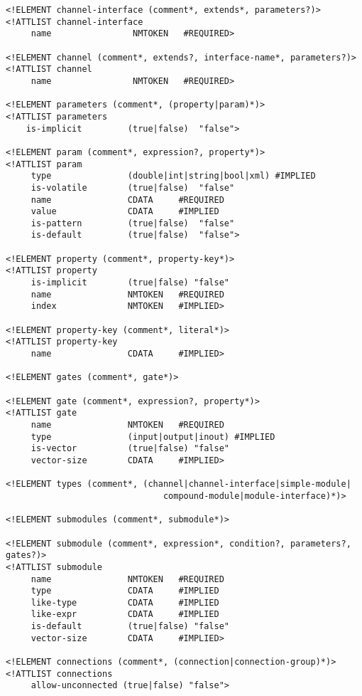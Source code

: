 \begin{verbatim}
<!ELEMENT channel-interface (comment*, extends*, parameters?)>
<!ATTLIST channel-interface
     name                NMTOKEN   #REQUIRED>

<!ELEMENT channel (comment*, extends?, interface-name*, parameters?)>
<!ATTLIST channel
     name                NMTOKEN   #REQUIRED>

<!ELEMENT parameters (comment*, (property|param)*)>
<!ATTLIST parameters
    is-implicit         (true|false)  "false">

<!ELEMENT param (comment*, expression?, property*)>
<!ATTLIST param
     type               (double|int|string|bool|xml) #IMPLIED
     is-volatile        (true|false)  "false"
     name               CDATA     #REQUIRED
     value              CDATA     #IMPLIED
     is-pattern         (true|false)  "false"
     is-default         (true|false)  "false">

<!ELEMENT property (comment*, property-key*)>
<!ATTLIST property
     is-implicit        (true|false) "false"
     name               NMTOKEN   #REQUIRED
     index              NMTOKEN   #IMPLIED>

<!ELEMENT property-key (comment*, literal*)>
<!ATTLIST property-key
     name               CDATA     #IMPLIED>

<!ELEMENT gates (comment*, gate*)>

<!ELEMENT gate (comment*, expression?, property*)>
<!ATTLIST gate
     name               NMTOKEN   #REQUIRED
     type               (input|output|inout) #IMPLIED
     is-vector          (true|false) "false"
     vector-size        CDATA     #IMPLIED>

<!ELEMENT types (comment*, (channel|channel-interface|simple-module|
                               compound-module|module-interface)*)>

<!ELEMENT submodules (comment*, submodule*)>

<!ELEMENT submodule (comment*, expression*, condition?, parameters?, gates?)>
<!ATTLIST submodule
     name               NMTOKEN   #REQUIRED
     type               CDATA     #IMPLIED
     like-type          CDATA     #IMPLIED
     like-expr          CDATA     #IMPLIED
     is-default         (true|false) "false"
     vector-size        CDATA     #IMPLIED>

<!ELEMENT connections (comment*, (connection|connection-group)*)>
<!ATTLIST connections
     allow-unconnected (true|false) "false">


\end{verbatim}
